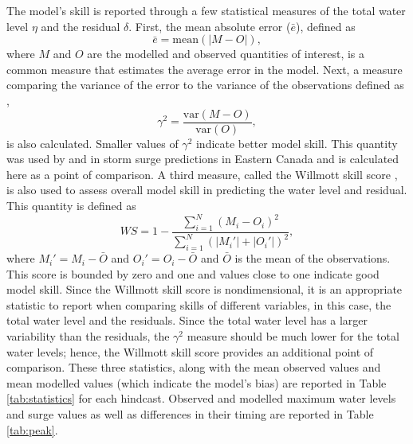 \documentclass[letterpaper]{tATO2e}
\begin{document}
The model's skill is reported through a few statistical measures of the total water level $\eta$ and the residual $\delta$. First, the mean absolute error ($\bar{e}$), defined as
\begin{equation}
\bar{e} = \text{mean}\left(\left| M - O \right|\right),
\end{equation}
where $M$ and $O$ are the modelled and observed quantities of interest, is a common measure that estimates the average error in the model. Next, a measure comparing the variance of the error to the variance of the observations defined as \citep{thompson2003prediction},
\begin{equation}
\gamma^2 = \frac{\text{var}\left(M-O\right)}{\text{var}\left(O\right)},
\end{equation}
is also calculated. Smaller values of $\gamma^2$ indicate better model skill. This quantity was used by \citet{bernier2006predicting} and \citet{bernier2010tide} in storm surge predictions in Eastern Canada and is calculated here as a point of comparison. A third measure, called the Willmott skill score \citep{willmott1982some}, is also used to assess overall model skill in predicting the water level and residual. This quantity is defined as
\begin{equation}
WS = 1 - \frac{\sum_{i=1}^N \left(M_i - O_i\right)^2}{\sum_{i=1}^N \left(|M_i'| + |O_i'|\right)^2},
\end{equation} 
where $M_i' = M_i-\bar{O}$ and $O_i'=O_i-\bar{O}$ and $\bar{O}$ is the mean of the observations. This score is bounded by zero and one and values close to one indicate good model skill. Since the Willmott skill score is nondimensional, it is an appropriate statistic to report when comparing skills of different variables, in this case, the total water level and the residuals. Since the total water level has a larger variability than the residuals, the $\gamma^2$ measure should be much lower for the total water levels; hence, the Willmott skill score provides an additional point of comparison. These three statistics, along with the mean observed values and mean modelled values (which indicate the model's bias) are reported in Table \ref{tab:statistics} for each hindcast.  {\color{red} Observed and modelled maximum water levels and surge values as well as differences in their timing are reported in Table \ref{tab:peak}.}
\end{document}
